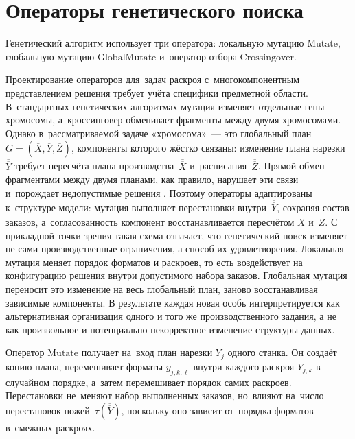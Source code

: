 \section{Операторы генетического поиска}\label{sec:alg/operators}

Генетический алгоритм использует три оператора: локальную мутацию $\mathrm{Mutate}$, глобальную мутацию $\mathrm{GlobalMutate}$ и~оператор отбора $\mathrm{Crossingover}$.

Проектирование операторов для~задач раскроя с~многокомпонентным представлением решения требует учёта специфики предметной области.
В~стандартных генетических алгоритмах \cite{goldberg1989genetic, holland1992_adaptation, goldberg1989_ga_search} мутация изменяет отдельные гены хромосомы, а~кроссинговер обменивает фрагменты между двумя хромосомами.
Однако в~рассматриваемой задаче «хромосома»~--- это глобальный план $G=(\overline{\overline{X}},\overline{\overline{Y}},\overline{\overline{Z}})$, компоненты которого жёстко связаны: изменение плана нарезки~$\overline{\overline{Y}}$ требует пересчёта плана производства~$\overline{\overline{X}}$ и~расписания~$\overline{\overline{Z}}$.
Прямой обмен фрагментами между двумя планами, как правило, нарушает эти связи и~порождает недопустимые решения \cite{kureichik1998,genetics_2}.
Поэтому операторы адаптированы к~структуре модели: мутация выполняет перестановки внутри~$\overline{\overline{Y}}$, сохраняя состав заказов, а~согласованность компонент восстанавливается пересчётом $\overline{\overline{X}}$ и~$\overline{\overline{Z}}$.
С прикладной точки зрения такая схема означает, что генетический поиск изменяет не сами производственные ограничения, а способ их удовлетворения. Локальная мутация меняет порядок форматов и раскроев, то есть воздействует на конфигурацию решения внутри допустимого набора заказов. Глобальная мутация переносит это изменение на весь глобальный план, заново восстанавливая зависимые компоненты. В результате каждая новая особь интерпретируется как альтернативная организация одного и того же производственного задания, а не как произвольное и потенциально некорректное изменение структуры данных.

Оператор $\mathrm{Mutate}$ получает на~вход план нарезки $\overline{Y}_j$ одного станка.
Он создаёт копию плана, перемешивает форматы $y_{j,k,\ell}$ внутри каждого раскроя $Y_{j,k}$ в случайном порядке, а~затем перемешивает порядок самих раскроев.
Перестановки не~меняют набор выполненных заказов, но~влияют на~число перестановок ножей~$\tau(\overline{\overline{Y}})$, поскольку оно зависит от~порядка форматов в~смежных раскроях.

